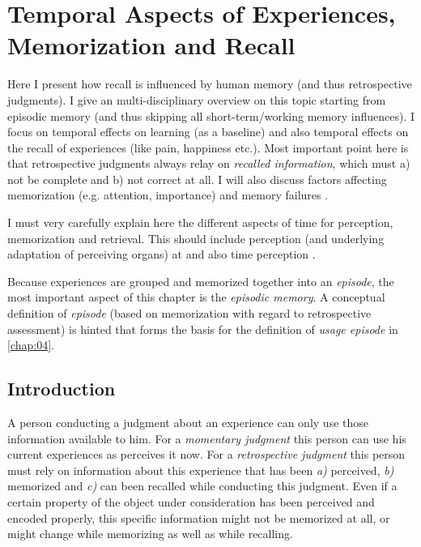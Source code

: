 \chapter{Temporal Aspects of Experiences, Memorization and Recall}\label{chap:03}
\begin{chapter-abstract}
Here I present how recall is influenced by human memory (and thus retrospective judgments).
I give an multi-disciplinary overview on this topic starting from episodic memory (and thus skipping all short-term/working memory influences).
I focus on temporal effects on learning (as a baseline) and also temporal effects on the recall of experiences (like pain, happiness etc.).
Most important point here is that retrospective judgments always relay on \textit{recalled information}, which must a) not be complete and b) not correct at all.
I will also discuss factors affecting memorization (e.g. attention, importance) and memory failures \citep{schacter_seven_2002}.

I must very carefully explain here the different aspects of time for perception, memorization and retrieval.
This should include perception (and underlying adaptation of perceiving organs) at and also time perception \cite{wittmann_neuropsychologie_2009}.


Because experiences are grouped and memorized together into an \emph{episode}, the most important aspect of this chapter is the \emph{episodic memory}.
A conceptual definition of \emph{episode} (based on memorization with regard to retrospective assessment) is hinted that forms the basis for the definition of \emph{usage episode} in \autoref{chap:04}.
\end{chapter-abstract}

\section{Introduction}
A person conducting a judgment about an experience can only use those information available to him.
For a \emph{momentary judgment} this person can use his current experiences as perceives it now.
For a \emph{retrospective judgment} this person must rely on information about this experience that has been \emph{a)} perceived, \emph{b)} memorized and \emph{c)} can been recalled while conducting this judgment.
Even if a certain property of the object under consideration has been perceived and encoded properly, this specific information might not be memorized at all, or might change while memorizing as well as while recalling.

